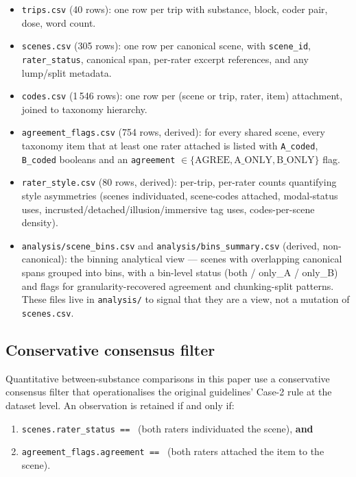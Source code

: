 \begin{itemize}[itemsep=2pt]
\item \texttt{trips.csv} (40 rows): one row per trip with substance, block, coder pair, dose, word count.
\item \texttt{scenes.csv} (305 rows): one row per canonical scene, with \texttt{scene\_id}, \texttt{rater\_status}, canonical span, per-rater excerpt references, and any lump/split metadata.
\item \texttt{codes.csv} (1\,546 rows): one row per (scene or trip, rater, item) attachment, joined to taxonomy hierarchy.
\item \texttt{agreement\_flags.csv} (754 rows, derived): for every shared scene, every taxonomy item that at least one rater attached is listed with \texttt{A\_coded}, \texttt{B\_coded} booleans and an \texttt{agreement} $\in \{\text{AGREE}, \text{A\_ONLY}, \text{B\_ONLY}\}$ flag.
\item \texttt{rater\_style.csv} (80 rows, derived): per-trip, per-rater counts quantifying style asymmetries (scenes individuated, scene-codes attached, modal-status uses, incrusted/detached/illusion/immersive tag uses, codes-per-scene density).
\item \texttt{analysis/scene\_bins.csv} and \texttt{analysis/bins\_summary.csv} (derived, non-canonical): the binning analytical view --- scenes with overlapping canonical spans grouped into bins, with a bin-level status (both / only\_A / only\_B) and flags for granularity-recovered agreement and chunking-split patterns. These files live in \texttt{analysis/} to signal that they are a view, not a mutation of \texttt{scenes.csv}.
\end{itemize}

\subsection{Conservative consensus filter}
\label{sec:consensus-filter}

Quantitative between-substance comparisons in this paper use a conservative consensus filter that operationalises the original guidelines' Case-2 rule at the dataset level. An observation is retained if and only if:

\begin{enumerate}[itemsep=2pt]
\item \texttt{scenes.rater\_status == } (both raters individuated the scene), \textbf{and}
\item \texttt{agreement\_flags.agreement == } (both raters attached the item to the scene).
\end{enumerate}

